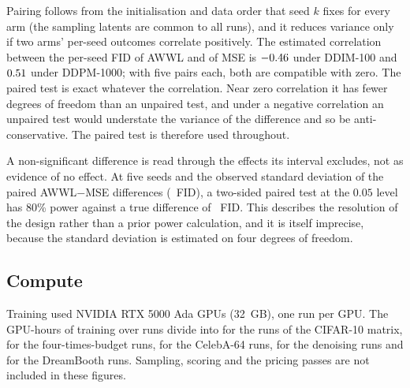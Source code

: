 Pairing follows from the initialisation and data order that seed $k$ fixes
for every arm (the sampling latents are common to all runs), and it reduces
variance only if two arms' per-seed outcomes correlate positively. The
estimated correlation between the per-seed FID of AWWL and of MSE is
$-0.46$ under DDIM-100 and $0.51$ under DDPM-1000; with five pairs each, both are compatible with zero. The paired
test is exact whatever the correlation. Near zero correlation it has fewer
degrees of freedom than an unpaired test, and under a negative correlation an
unpaired test would understate the variance of the difference and so be
anti-conservative. The paired test is therefore used throughout.

A non-significant difference is read through the effects its interval
excludes, not as evidence of no effect. At five seeds and the observed
standard deviation of the paired AWWL$-$MSE differences
(\sdPairedAWWL~FID), a two-sided paired test at the $0.05$ level has 80\%
power against a true difference of \mdeAWWL~FID. This describes the resolution
of the design rather than a prior power calculation, and it is itself
imprecise, because the standard deviation is estimated on four degrees of
freedom.

\subsection{Compute}
\label{app:setup-compute}

Training used NVIDIA RTX 5000 Ada GPUs (32~GB), one run per GPU. The
\gpuHoursTotal{} GPU-hours of training over \nRunsTotal{} runs divide into
\gpuHoursCifar{} for the \nRunsCifar{} runs of the CIFAR-10 matrix,
\gpuHoursLong{} for the \nRunsLong{} four-times-budget runs,
\gpuHoursCeleba{} for the \nRunsCeleba{} CelebA-64 runs,
\gpuHoursRestoration{} for the \nRunsRestoration{} denoising runs and
\gpuHoursDreambooth{} for the \nRunsDreambooth{} DreamBooth runs. Sampling,
scoring and the pricing passes are not included in these figures.
